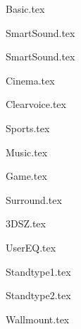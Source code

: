 {Basic.tex}

{SmartSound.tex}

{SmartSound.tex}


{Cinema.tex}

{Clearvoice.tex}

{Sports.tex}

{Music.tex}

{Game.tex}

{Surround.tex}

{3DSZ.tex}

{UserEQ.tex}


{Standtype1.tex}

{Standtype2.tex}

{Wallmount.tex}
